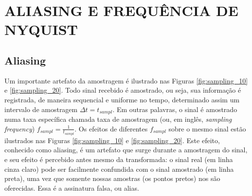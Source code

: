 \chapter{ALIASING E FREQUÊNCIA DE NYQUIST}

\section{Aliasing}

Um importante artefato da amostragem é ilustrado nas Figuras \ref{fig:sampling_10} e \ref{fig:sampling_20}. Todo sinal recebido é amostrado, ou seja, sua informação é registrada, de maneira sequencial e uniforme no tempo, determinado assim um intervalo de amostragem $\Delta t = t_{sampl}$. Em outras palavras, o sinal é amostrado numa taxa específica chamada taxa de amostragem (ou, em inglês, \textit{sampling frequency}) $f_{sampl} = \frac{1}{t_{sampl}}$. Os efeitos de diferentes $f_{sampl}$ sobre o mesmo sinal estão ilustrados nas Figuras \ref{fig:sampling_10} e \ref{fig:sampling_20}. Este efeito, conhecido como aliasing, é um artefato que surge durante a amostragem do sinal, e seu efeito é percebido antes mesmo da transformada: o sinal real (em linha cinza claro) pode ser facilmente confundida com o sinal amostrado (em linha preta), uma vez que somente nossas amostras (os pontos pretos) nos são oferecidas. Essa é a assinatura falsa, ou alias.


